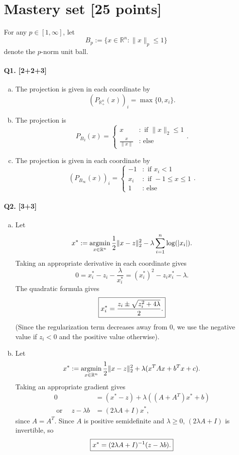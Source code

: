 \documentclass[11pt]{article}
\newcommand{\R}{\mathbb{R}}
\newcommand{\argmin}{\operatornamewithlimits{argmin}}   %
\newcommand{\inv}{{^{-1}}}                              %
\begin{document}
\twocolumn
\section{Mastery set [25 points]}
For any $p \in [1,\infty]$, let
\[B_p := \{x \in \R^n : \|x\|_p \leq 1\}\]
denote the $p$-norm unit ball.
\paragraph{Q1. [2+2+3]}
\begin{enumerate}[(a)]
\item The projection is given in each coordinate by
\[(P_{\R^n_+}(x))_i = \max \{0,x_i\}.\]
 
\item The projection is
\[P_{B_2}(x)
 =  \left\{
        \begin{array}{ll}
            x                   & : \mbox{ if } \|x\|_2 \leq 1  \\
            \frac{x}{\|x\|}     & : \mbox{ else }
        \end{array}
    \right..
\]
 
\item The projection is given in each coordinate by
\[(P_{B_\infty}(x))_i
 =  \left\{
        \begin{array}{ll}
            -1      & : \mbox{ if } x_i < 1  \\
            x_i     & : \mbox{ if } -1 \leq x \leq 1    \\
             1      & : \mbox{ else }
        \end{array}
    \right..
\]
 
\end{enumerate}

\paragraph{Q2. [3+3]}
\begin{enumerate}[(a)]
\item Let
\[x^* := \argmin_{x \in \R^n} \frac{1}{2}\|x - z\|_2^2
    - \lambda \sum_{i = 1}^n \log(|x_i|).\]
Taking an appropriate derivative in each coordinate gives
\[0 = x_i^* - z_i - \frac{\lambda}{x_i^*}
    = (x_i^*)^2 - z_ix_i^* - \lambda.\]
The quadratic formula gives
\[\mbox{\fbox{$\displaystyle x_i^*
    = \frac{z_i \pm \sqrt{z_i^2 + 4\lambda}}{2}$.}}\]
(Since the regularization term decreases away from $0$, we use the negative
value if $z_i < 0$ and the positive value otherwise).

\item Let
\[x^* := \argmin_{x \in \R^n} \frac{1}{2}\|x - z\|_2^2
    + \lambda(x^TAx + b^Tx + c).\]
Taking an appropriate gradient gives
\begin{align*}
0 & = (x^* - z) + \lambda((A + A^T)x^* + b) \\
\mbox{ or } \quad z - \lambda b & = (2\lambda A + I)x^*,
\end{align*}
since $A = A^T$. Since $A$ is positive semidefinite and $\lambda \geq 0$,
$(2\lambda A + I)$ is invertible, so
\[\mbox{\fbox{$\displaystyle x^* = (2\lambda A + I)\inv(z - \lambda b)$.}}\]
\end{enumerate}
\end{document}
